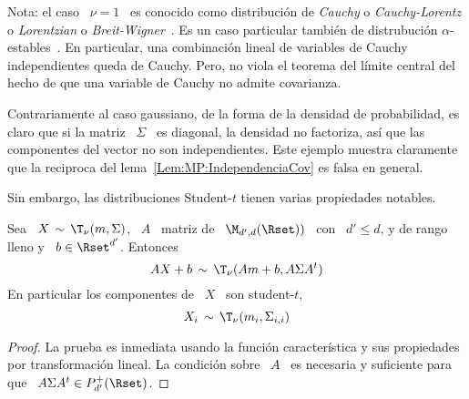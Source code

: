 Nota: el caso  \ $\nu = 1$ \  es conocido como distribuci\'on de  {\em Cauchy} o
{\em  Cauchy-Lorentz} o  {\em Lorentzian}  o  {\em Breit-Wigner}~\cite{Cau53:07,
  Cau53,  Bien53, Bie53:07,  BreWig36, Sti74,  SamTaq94, Lorentz}.   Es  un caso
particular  tambi\'en de  distrubuci\'on  $\alpha$-estables~\cite{SamTaq94}.  En
particular, una combinaci\'on lineal de variables de Cauchy independientes queda
de Cauchy. Pero, no  viola el teorema del l\'imite central del  hecho de que una
variable de Cauchy no admite covarianza.

Contrariamente al caso gaussiano, de la forma de la densidad de probabilidad, es
claro que si la matriz \ $\Sigma$ \ es diagonal, la densidad no factoriza, as\'i
que  las componentes  del vector  no son  independientes.  Este  ejemplo muestra
claramente que  la reciproca del lema~\ref{Lem:MP:IndependenciaCov}  es falsa en
general.

Sin embargo, las distribuciones Student-$t$ tienen varias propiedades notables.

\begin{lema}
\label{Lem:MP:StabilidadLinealStudentT}
%
  Sea \ $X \, \sim \,  \T_\nu(m,\Sigma)$, \ $A$ \ matriz de \ $\M_{d',d}(\Rset))$
  \ con \ $d' \le d$, y de rango lleno y \ $b \in \Rset^{d'}$. Entonces
  \[
  A X + b\, \sim \, \T_\nu( A m + b , A \Sigma A^t)
  \]
  En particular los componentes de \ $X$ \ son student-$t$,
  \[
  X_i \, \sim \, \T_\nu(m_i , \Sigma_{i,i} )
  \]
\end{lema}
\begin{proof}
  La prueba es inmediata usando  la funci\'on caracter\'istica y sus propiedades
  por  transformaci\'on lineal.  La condici\'on  sobre \  $A$ \  es  necesaria y
  suficiente para que \ $A \Sigma A^t \in P_{d'}^+(\Rset)$.
\end{proof}

